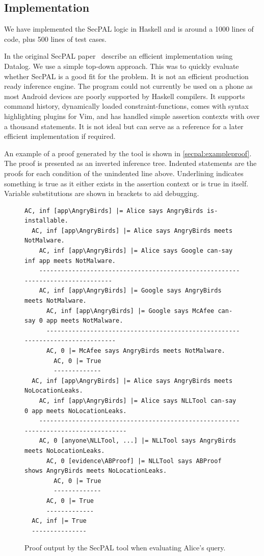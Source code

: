 \documentclass[a4paper,sfsidenotes]{%
  scrartcl%
}
\begin{document}
\subsection{Implementation}

We have implemented the SecPAL logic in Haskell and is around a
1000 lines of code, plus 500 lines of test cases.

In the original SecPAL paper~\cite{Becker:2006vh}
\citeauthor*{Becker:2006vh} describe an efficient implementation using Datalog.
We use a simple top-down approach.
This was to quickly evaluate whether SecPAL is a good fit for
the problem. It is not an efficient production ready inference
engine.  The program could not currently be used on a phone as most Android devices
 are poorly supported by Haskell compilers.
It supports command history, dynamically loaded constraint-functions,
comes with syntax highlighting plugins for Vim, and has handled simple assertion
contexts with over a thousand statements. It is not ideal but can serve as
a reference for a later efficient implementation if required.

An example of a proof generated by the tool is shown in
\autoref{secpal:exampleproof}.  The proof is presented as an inverted
inference tree. Indented statements are the proofs for each condition of
the unindented line above.  Underlining indicates something is  true
as it either exists in the assertion context or is true in itself. Variable
substitutions are shown in brackets to aid debugging.

\begin{figure}
  \begin{lstlisting}[basicstyle=\small\ttfamily,columns=flexible,mathescape]
AC, inf [app\AngryBirds] |= Alice says AngryBirds is-installable.
  AC, inf [app\AngryBirds] |= Alice says AngryBirds meets NotMalware.
    AC, inf [app\AngryBirds] |= Alice says Google can-say inf app meets NotMalware.
    -------------------------------------------------------------------------------
    AC, inf [app\AngryBirds] |= Google says AngryBirds meets NotMalware.
      AC, inf [app\AngryBirds] |= Google says McAfee can-say 0 app meets NotMalware.
      ------------------------------------------------------------------------------
      AC, 0 |= McAfee says AngryBirds meets NotMalware.
        AC, 0 |= True
        -------------
  AC, inf [app\AngryBirds] |= Alice says AngryBirds meets NoLocationLeaks.
    AC, inf [app\AngryBirds] |= Alice says NLLTool can-say 0 app meets NoLocationLeaks.
    -----------------------------------------------------------------------------------
    AC, 0 [anyone\NLLTool, ...] |= NLLTool says AngryBirds meets NoLocationLeaks.
      AC, 0 [evidence\ABProof] |= NLLTool says ABProof shows AngryBirds meets NoLocationLeaks.
        AC, 0 |= True
        -------------
      AC, 0 |= True
      -------------
  AC, inf |= True
  ---------------
  \end{lstlisting}
  \caption{Proof output by the SecPAL tool when evaluating Alice's query.}
\label{secpal:exampleproof}
\end{figure}
\end{document}
